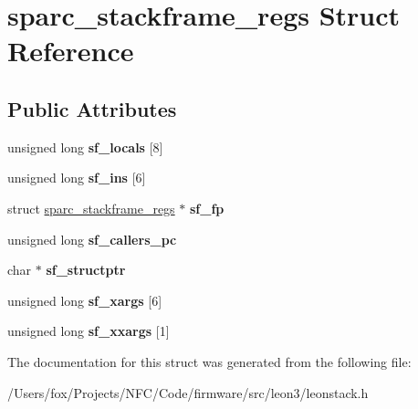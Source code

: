 \hypertarget{structsparc__stackframe__regs}{
\section{sparc\_\-stackframe\_\-regs Struct Reference}
\label{structsparc__stackframe__regs}
}
\subsection*{Public Attributes}
\begin{DoxyCompactItemize}
\item 
\hypertarget{structsparc__stackframe__regs_a2edeb498f204fcd250a0ba3f7f723a03}{
unsigned long {\bfseries sf\_\-locals} \mbox{[}8\mbox{]}}
\label{structsparc__stackframe__regs_a2edeb498f204fcd250a0ba3f7f723a03}

\item 
\hypertarget{structsparc__stackframe__regs_a7af13d3ee9fc9025b3da3dbd26c69133}{
unsigned long {\bfseries sf\_\-ins} \mbox{[}6\mbox{]}}
\label{structsparc__stackframe__regs_a7af13d3ee9fc9025b3da3dbd26c69133}

\item 
\hypertarget{structsparc__stackframe__regs_a6096338d99d45543041fb700c5919f59}{
struct \hyperlink{structsparc__stackframe__regs}{sparc\_\-stackframe\_\-regs} $\ast$ {\bfseries sf\_\-fp}}
\label{structsparc__stackframe__regs_a6096338d99d45543041fb700c5919f59}

\item 
\hypertarget{structsparc__stackframe__regs_a18f96b6d5b37552cb346446ca8e66297}{
unsigned long {\bfseries sf\_\-callers\_\-pc}}
\label{structsparc__stackframe__regs_a18f96b6d5b37552cb346446ca8e66297}

\item 
\hypertarget{structsparc__stackframe__regs_a423cb161e6c935edafc69c6efd12dd39}{
char $\ast$ {\bfseries sf\_\-structptr}}
\label{structsparc__stackframe__regs_a423cb161e6c935edafc69c6efd12dd39}

\item 
\hypertarget{structsparc__stackframe__regs_a58dfd7e8533f254f066f898a97203c3d}{
unsigned long {\bfseries sf\_\-xargs} \mbox{[}6\mbox{]}}
\label{structsparc__stackframe__regs_a58dfd7e8533f254f066f898a97203c3d}

\item 
\hypertarget{structsparc__stackframe__regs_a311f12694e36bf3b8ab66b8ba8e37ad2}{
unsigned long {\bfseries sf\_\-xxargs} \mbox{[}1\mbox{]}}
\label{structsparc__stackframe__regs_a311f12694e36bf3b8ab66b8ba8e37ad2}

\end{DoxyCompactItemize}


The documentation for this struct was generated from the following file:\begin{DoxyCompactItemize}
\item 
/Users/fox/Projects/NFC/Code/firmware/src/leon3/leonstack.h\end{DoxyCompactItemize}
